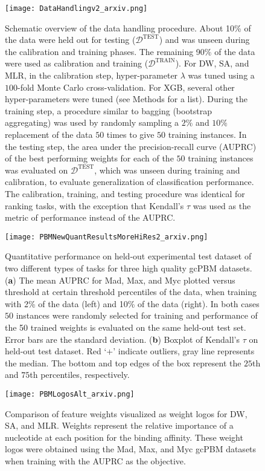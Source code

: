 \documentclass[aps,pra,groupedaddress,nofootinbib,notitlepage,showpacs,floatfix,superscriptaddress]{revtex4-1}
\begin{document}
\begin{figure}[htp]
 \texttt{[image: DataHandlingv2\_arxiv.png]}
 \caption{Schematic overview of the data handling procedure. About 10\% of the data were held out for testing ($\mathcal{D}^\textrm{TEST}$) and was unseen during the calibration and training phases. The remaining 90\% of the data were used as calibration and training ($\mathcal{D}^\textrm{TRAIN}$). For DW, SA, and MLR, in the calibration step, hyper-parameter $\lambda$ was tuned using a $100$-fold Monte Carlo cross-validation. For XGB, several other hyper-parameters were tuned (see Methods for a list). During the training step, a procedure similar to bagging (bootstrap aggregating) was used by randomly sampling a $2\%$ and $10\%$ replacement of the data $50$ times to give $50$ training instances. In the testing step, the area under the precision-recall curve (AUPRC) of the best performing weights for each of the $50$ training instances was evaluated on $\mathcal{D}^\textrm{TEST}$, which was unseen during training and calibration, to evaluate generalization of classification performance. The calibration, training, and testing procedure was identical for ranking tasks, with the exception that Kendall's $\tau$ was used as the metric of performance instead of the AUPRC.}\label{fig:DataHandling}
\end{figure}

\begin{figure}[htp]
\texttt{[image: PBMNewQuantResultsMoreHiRes2\_arxiv.png]}
\caption{Quantitative performance on held-out experimental test dataset of two different types of tasks for three high quality gcPBM datasets. (\textbf{a}) The mean AUPRC for Mad, Max, and Myc plotted versus threshold at certain threshold percentiles of the data, when training with 2\% of the data (left) and 10\% of the data (right). In both cases $50$ instances were randomly selected for training and performance of the 50 trained weights is evaluated on the same held-out test set. Error bars are the standard deviation. (\textbf{b}) Boxplot of Kendall's $\tau$ on held-out test dataset. Red `+' indicate outliers, gray line represents the median. The bottom and top edges of the box represent the $25$th and $75$th percentiles, respectively.}\label{fig:PBMQuantResults}
\end{figure}

\begin{figure}[htp]
\texttt{[image: PBMLogosAlt\_arxiv.png]}
\caption{Comparison of feature weights visualized as weight logos for DW, SA, and MLR. Weights represent the relative importance of a nucleotide at each position for the binding affinity. These weight logos were obtained using the Mad, Max, and Myc gcPBM datasets when training with the AUPRC as the objective.}\label{fig:PBMWeightLogos}
\end{figure}
\end{document}
